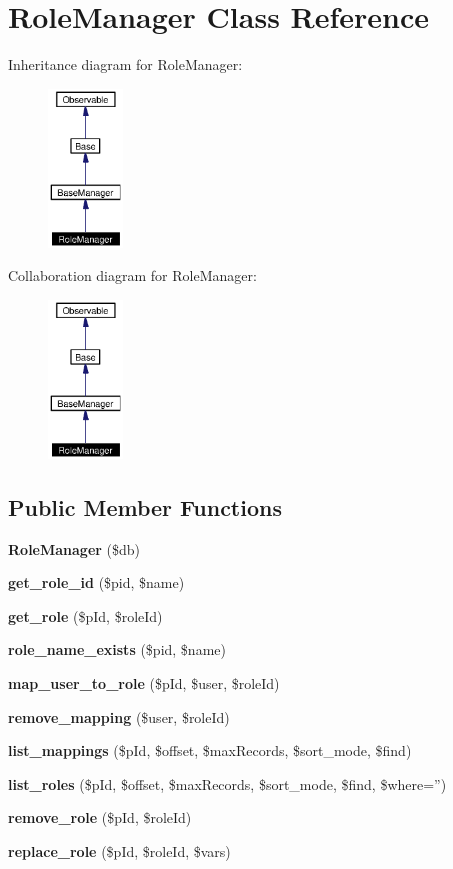 \section{Role\-Manager Class Reference}
\label{classRoleManager}
Inheritance diagram for Role\-Manager:\begin{figure}[H]
\begin{center}
\leavevmode
\includegraphics[width=56pt]{classRoleManager__inherit__graph}
\end{center}
\end{figure}
Collaboration diagram for Role\-Manager:\begin{figure}[H]
\begin{center}
\leavevmode
\includegraphics[width=56pt]{classRoleManager__coll__graph}
\end{center}
\end{figure}
\subsection*{Public Member Functions}
\begin{CompactItemize}
\item 
{\bf Role\-Manager} (\$db)
\item 
{\bf get\_\-role\_\-id} (\$pid, \$name)\label{classRoleManager_a1}

\item 
{\bf get\_\-role} (\$p\-Id, \$role\-Id)
\item 
{\bf role\_\-name\_\-exists} (\$pid, \$name)
\item 
{\bf map\_\-user\_\-to\_\-role} (\$p\-Id, \$user, \$role\-Id)
\item 
{\bf remove\_\-mapping} (\$user, \$role\-Id)
\item 
{\bf list\_\-mappings} (\$p\-Id, \$offset, \$max\-Records, \$sort\_\-mode, \$find)
\item 
{\bf list\_\-roles} (\$p\-Id, \$offset, \$max\-Records, \$sort\_\-mode, \$find, \$where='')
\item 
{\bf remove\_\-role} (\$p\-Id, \$role\-Id)
\item 
{\bf replace\_\-role} (\$p\-Id, \$role\-Id, \$vars)
\end{CompactItemize}


